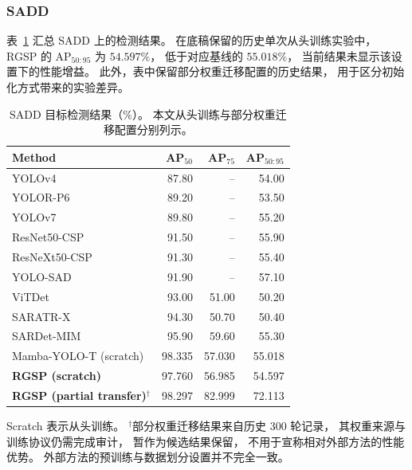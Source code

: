 \documentclass[journal]{IEEEtran}
\begin{document}
\subsubsection{SADD}
\label{sec:sadd_results}

表~\ref{tab:sadd_comparison}
汇总 SADD 上的检测结果。
在底稿保留的历史单次从头训练实验中，
RGSP 的 AP$_{50:95}$ 为 $54.597\%$，
低于对应基线的 $55.018\%$，
当前结果未显示该设置下的性能增益。
此外，表中保留部分权重迁移配置的历史结果，
用于区分初始化方式带来的实验差异。

\begin{table}[!tbp]
\centering
\small
\setlength{\tabcolsep}{3pt}
\caption{SADD 目标检测结果（\%）。
本文从头训练与部分权重迁移配置分别列示。}
\label{tab:sadd_comparison}
\begin{tabular*}{\linewidth}{@{\extracolsep{\fill}}lrrr}
\toprule
Method & AP$_{50}$ & AP$_{75}$ & AP$_{50:95}$ \\
\midrule
YOLOv4            & 87.80 & --    & 54.00 \\
YOLOR-P6          & 89.20 & --    & 53.50 \\
YOLOv7            & 89.80 & --    & 55.20 \\
ResNet50-CSP      & 91.50 & --    & 55.90 \\
ResNeXt50-CSP     & 91.30 & --    & 55.40 \\
YOLO-SAD          & 91.90 & --    & 57.10 \\
ViTDet            & 93.00 & 51.00 & 50.20 \\
SARATR-X          & 94.30 & 50.70 & 50.40 \\
SARDet-MIM        & 95.90 & 59.60 & 55.30 \\
\midrule
Mamba-YOLO-T (scratch)
                  & 98.335 & 57.030 & 55.018 \\
\textbf{RGSP (scratch)}
                  & 97.760 & 56.985 & 54.597 \\
\textbf{RGSP (partial transfer)}$^{\dagger}$
                  & 98.297 & 82.999 & 72.113 \\
\bottomrule
\end{tabular*}

\smallskip
\begin{minipage}{\linewidth}
\footnotesize
Scratch 表示从头训练。
$^{\dagger}$部分权重迁移结果来自历史 300 轮记录，
其权重来源与训练协议仍需完成审计，
暂作为候选结果保留，
不用于宣称相对外部方法的性能优势。
外部方法的预训练与数据划分设置并不完全一致。
\end{minipage}
\end{table}
\end{document}
